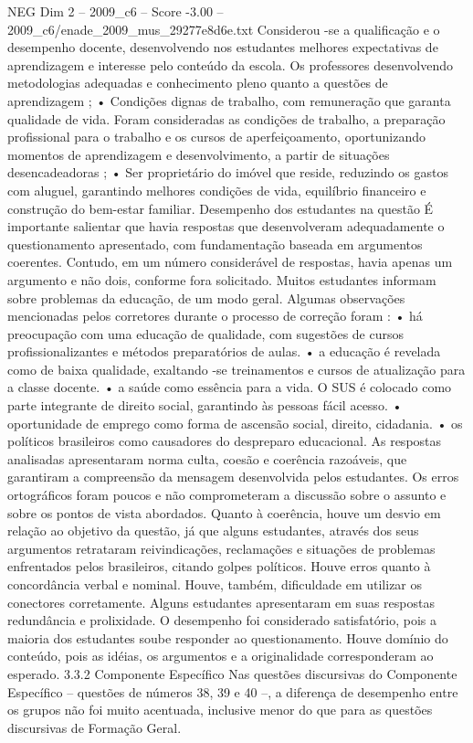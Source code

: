 \begin{textsample}{NEG Dim 2 – 2009\_c6 – Score -3.00 – 2009\_c6/enade\_2009\_mus\_29277e8d6e.txt}
Considerou -se a qualificação e o desempenho docente, desenvolvendo nos estudantes melhores expectativas de aprendizagem e interesse pelo conteúdo da escola.
Os professores desenvolvendo metodologias adequadas e conhecimento pleno quanto a questões de aprendizagem ; • Condições dignas de trabalho, com remuneração que garanta qualidade de vida.
Foram consideradas as condições de trabalho, a preparação profissional para o trabalho e os cursos de aperfeiçoamento, oportunizando momentos de aprendizagem e desenvolvimento, a partir de situações desencadeadoras ; • Ser proprietário do imóvel que reside, reduzindo os gastos com aluguel, garantindo melhores condições de vida, equilíbrio financeiro e construção do bem-estar familiar.
Desempenho dos estudantes na questão É importante salientar que havia respostas que desenvolveram adequadamente o questionamento apresentado, com fundamentação baseada em argumentos coerentes.
Contudo, em um número considerável de respostas, havia apenas um argumento e não dois, conforme fora solicitado.
Muitos estudantes informam sobre problemas da educação, de um modo geral.
Algumas observações mencionadas pelos corretores durante o processo de correção foram : • há preocupação com uma educação de qualidade, com sugestões de cursos profissionalizantes e métodos preparatórios de aulas. • a educação é revelada como de baixa qualidade, exaltando -se treinamentos e cursos de atualização para a classe docente. • a saúde como essência para a vida.
O SUS é colocado como parte integrante de direito social, garantindo às pessoas fácil acesso. • oportunidade de emprego como forma de ascensão social, direito, cidadania. • os políticos brasileiros como causadores do despreparo educacional.
As respostas analisadas apresentaram norma culta, coesão e coerência razoáveis, que garantiram a compreensão da mensagem desenvolvida pelos estudantes.
Os erros ortográficos foram poucos e não comprometeram a discussão sobre o assunto e sobre os pontos de vista abordados.
Quanto à coerência, houve um desvio em relação ao objetivo da questão, já que alguns estudantes, através dos seus argumentos retrataram reivindicações, reclamações e situações de problemas enfrentados pelos brasileiros, citando golpes políticos.
Houve erros quanto à concordância verbal e nominal.
Houve, também, dificuldade em utilizar os conectores corretamente.
Alguns estudantes apresentaram em suas respostas redundância e prolixidade.
O desempenho foi considerado satisfatório, pois a maioria dos estudantes soube responder ao questionamento.
Houve domínio do conteúdo, pois as idéias, os argumentos e a originalidade corresponderam ao esperado. 3.3.2 Componente Específico Nas questões discursivas do Componente Específico – questões de números 38, 39 e 40 –, a diferença de desempenho entre os grupos não foi muito acentuada, inclusive menor do que para as questões discursivas de Formação Geral.

\end{textsample}
